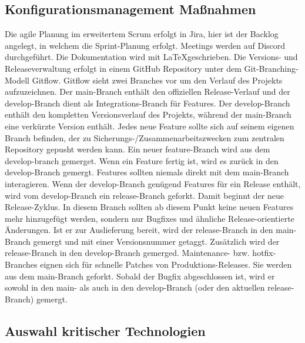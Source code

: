 \subsection{Konfigurationsmanagement Maßnahmen}
Die agile Planung im erweitertem Scrum erfolgt in Jira, hier ist der Backlog angelegt, in welchem die Sprint-Planung erfolgt. Meetings werden auf Discord durchgeführt. Die Dokumentation wird mit \LaTeX  geschrieben.\newline
Die Versions- und Releaseverwaltung erfolgt in einem GitHub Repository unter dem Git-Branching-Modell Gitflow. Gitflow sieht zwei Branches vor um den Verlauf des Projekts aufzuzeichnen. Der main-Branch enthält den offiziellen Release-Verlauf und der develop-Branch dient als Integrations-Branch für Features. Der develop-Branch enthält den kompletten Versionsverlauf des Projekts, während der main-Branch eine verkürzte Version enthält.\newline
Jedes neue Feature sollte sich auf seinem eigenen Branch befinden, der zu Sicherungs-/Zusammenarbeitszwecken zum zentralen Repository gepusht werden kann. Ein neuer feature-Branch  wird aus dem develop-branch gemerget. Wenn ein Feature fertig ist, wird es zurück in den develop-Branch gemergt. Features sollten niemals direkt mit dem main-Branch interagieren.\newline
Wenn der develop-Branch genügend Features für ein Release enthält, wird vom develop-Branch ein release-Branch geforkt. Damit beginnt der neue Release-Zyklus. In diesem Branch sollten ab diesem Punkt keine neuen Features mehr hinzugefügt werden, sondern nur Bugfixes und ähnliche Release-orientierte Änderungen. Ist er zur Auslieferung bereit, wird der release-Branch in den main-Branch gemergt und mit einer Versionsnummer getaggt. Zusätzlich wird der release-Branch in den develop-Branch gemerged. \newline
Maintenance- bzw. hotfix-Branches eignen sich für schnelle Patches von Produktions-Releases. Sie werden aus dem main-Branch geforkt. Sobald der Bugfix abgeschlossen ist, wird er sowohl in den main- als auch in den develop-Branch (oder den aktuellen release-Branch) gemergt.
\subsection{Auswahl kritischer Technologien}